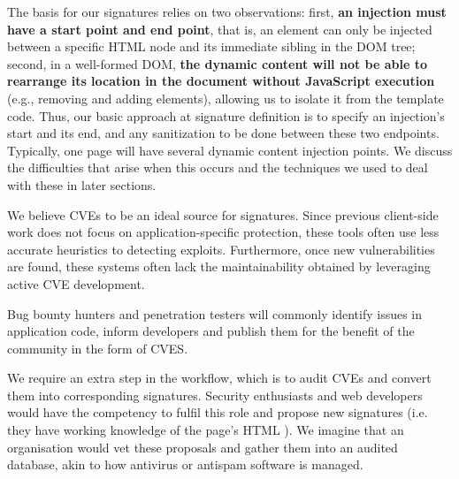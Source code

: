 The basis for our signatures relies on two observations: first, \textbf{an injection must have a start point and end point}, that is, an element can only be injected between a specific HTML node and its immediate sibling in the DOM tree; second, in a well-formed DOM, \textbf{the dynamic content will not be able to rearrange its location in the document without JavaScript execution} (e.g., removing and adding elements), allowing us to isolate it from the template code. Thus, our basic approach at signature definition is to specify an injection's start and its end, and any sanitization to be done between these two endpoints. Typically, one page will have several dynamic content injection points. We discuss the difficulties that arise when this occurs and the techniques we used to deal with these in later sections.

We believe CVEs to be an ideal source for signatures. Since previous client-side work does not focus on application-specific protection, these tools often use less accurate heuristics to detecting exploits. Furthermore, once new vulnerabilities are found, these systems often lack the maintainability obtained by leveraging active CVE development. 

Bug bounty hunters and penetration testers will commonly identify issues in application code, inform developers and publish them for the benefit of the community in the form of CVES.

We require an extra step in the workflow, which is to audit CVEs and convert them into corresponding signatures. Security enthusiasts and web developers would have the competency to fulfil this role and propose new signatures (i.e. they have working knowledge of the page's HTML ). We imagine that an organisation would vet these proposals and gather them into an audited database, akin to how antivirus or antispam software is managed.

 
